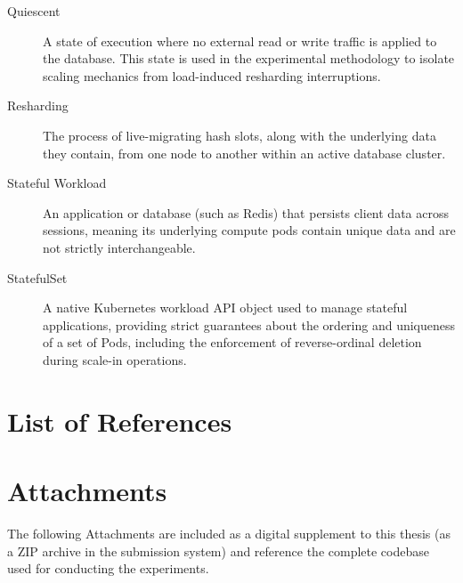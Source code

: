 \documentclass[12pt,a4paper]{report}
\begin{document}
\begin{description}
    \item[Quiescent] A state of execution where no external read or write traffic is applied to the database. This state is used in the experimental methodology to isolate scaling mechanics from load-induced resharding interruptions.
    
    \item[Resharding] The process of live-migrating hash slots, along with the underlying data they contain, from one node to another within an active database cluster.
    
    \item[Stateful Workload] An application or database (such as Redis) that persists client data across sessions, meaning its underlying compute pods contain unique data and are not strictly interchangeable.
    
    \item[StatefulSet] A native Kubernetes workload API object used to manage stateful applications, providing strict guarantees about the ordering and uniqueness of a set of Pods, including the enforcement of reverse-ordinal deletion during scale-in operations.

\end{description}


\newpage
\pagestyle{nohead} %
\section*{List of References}
\printbibliography[heading=none]


\newpage
\thispagestyle{nohead} %
\section*{Attachments}
The following Attachments are included as a digital supplement to this thesis (as a ZIP archive in the submission system) and reference the complete codebase used for conducting the experiments.
\end{document}
